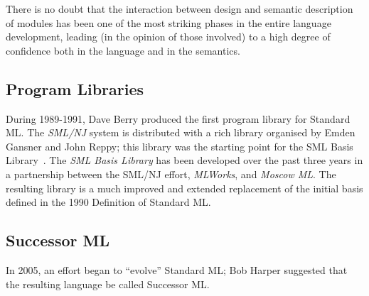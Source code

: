 There is no doubt that the interaction between design and semantic description
of modules has been one of the most striking phases in the entire language
development, leading (in the opinion of those involved) to a high degree of
confidence both in the language and in the semantics.


\subsection*{Program Libraries}
 During 1989-1991, Dave Berry produced the first program library for
 Standard ML\cite{mllib91,berry93}.
 The {\em SML/NJ} system is distributed with a rich library organised by
 Emden Gansner and John Reppy; this library was the starting point for
 the SML Basis Library~.
 The {\em SML Basis Library\/}\cite{sml-basis-lib} has been developed
 over the past three years in a
 partnership between the SML/NJ effort, {\em MLWorks}, and {\em Moscow ML}.
 The resulting library is a much improved and extended
 replacement of the initial basis defined in the 1990 Definition of
 Standard ML.

\subsection*{\protect\color{\addcolor} Successor ML}
{\color{\addcolor}
In 2005, an effort began to ``evolve'' Standard ML; Bob Harper suggested that the resulting language
be called Successor ML.
}
